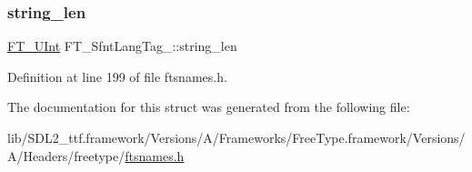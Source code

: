\mbox{\label{struct_f_t___sfnt_lang_tag___ad4789510e3dd1f515259cb59abc1d44c}} 
\subsubsection{\texorpdfstring{string\_len}{string\_len}}
{\footnotesize\ttfamily \mbox{\hyperlink{fttypes_8h_abcb8db4dbf35d2b55a9e8c7b0926dc52}{F\+T\+\_\+\+U\+Int}} F\+T\+\_\+\+Sfnt\+Lang\+Tag\+\_\+\+::string\+\_\+len}



Definition at line 199 of file ftsnames.\+h.



The documentation for this struct was generated from the following file\+:\begin{DoxyCompactItemize}
\item 
lib/\+S\+D\+L2\+\_\+ttf.\+framework/\+Versions/\+A/\+Frameworks/\+Free\+Type.\+framework/\+Versions/\+A/\+Headers/freetype/\mbox{\hyperlink{ftsnames_8h}{ftsnames.\+h}}\end{DoxyCompactItemize}
